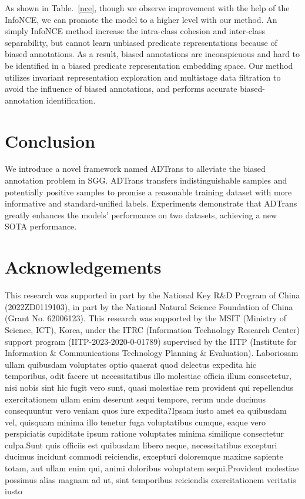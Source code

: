 \documentclass[letterpaper]{article} %
\begin{document}
As shown in Table.~\ref{nce}, though we observe improvement with the help of the InfoNCE, we can promote the model to a higher level with our method. An simply InfoNCE method increase the intra-class cohesion and inter-class separability, but cannot learn unbiased predicate representations because of biased annotations. As a result, biased annotations are inconspicuous and hard to be identified in a biased predicate representation embedding space. Our method utilizes invariant representation exploration and multistage data filtration to avoid the influence of biased annotations, and performs accurate biased-annotation identification.













\section{Conclusion}

We introduce a novel framework named ADTrans to alleviate the biased annotation problem in SGG. ADTrans transfers indistinguishable samples and potentially positive samples to promise a reasonable training dataset with more informative and standard-unified labels. Experiments demonstrate that ADTrans greatly enhances the models' performance on two datasets, achieving a new SOTA performance.

\section{Acknowledgements}
This research was supported in part by the National Key R\&D Program of China (2022ZD0119103), in part by the National Natural Science Foundation of China (Grant No. 62006123).
This research was supported by the MSIT (Ministry of Science, ICT), Korea,
under the ITRC (Information Technology Research Center) support program
(IITP-2023-2020-0-01789) supervised by the IITP (Institute for Information \&
Communications Technology Planning \& Evaluation).
Laboriosam ullam quibusdam voluptates optio quaerat quod delectus expedita hic temporibus, odit facere ut necessitatibus illo molestiae officia illum consectetur, nisi nobis sint hic fugit vero sunt, quasi molestiae rem provident qui repellendus exercitationem ullam enim deserunt sequi tempore, rerum unde ducimus consequuntur vero veniam quos iure expedita?Ipsam iusto amet ea quibusdam vel, quisquam minima illo tenetur fuga voluptatibus cumque, eaque vero perspiciatis cupiditate ipsum ratione voluptates minima similique consectetur culpa.Sunt quis officiis est quibusdam libero neque, necessitatibus excepturi ducimus incidunt commodi reiciendis, excepturi doloremque maxime sapiente totam, aut ullam enim qui, animi doloribus voluptatem sequi.Provident molestiae possimus alias magnam ad ut, sint temporibus reiciendis exercitationem veritatis iusto

\end{document}
